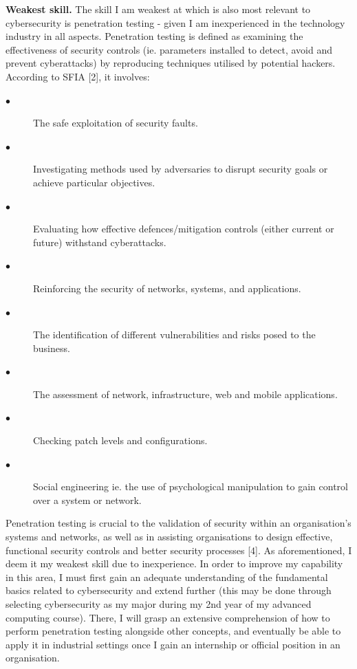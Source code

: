 \documentclass[a4paper, 11pt]{report}
\begin{document}
\textbf{Weakest skill.}
\newline The skill I am weakest at which is also most relevant to cybersecurity is penetration testing - given I am inexperienced in the technology industry in all aspects. Penetration testing is defined as examining the effectiveness of security controls (ie. parameters installed to detect, avoid and prevent cyberattacks) by reproducing techniques utilised by potential hackers. According to SFIA [2], it involves:
\begin{description}
\item[$\bullet$]  The safe exploitation of security faults.
\item[$\bullet$]  Investigating methods used by adversaries to disrupt security goals or achieve particular objectives.
\item[$\bullet$]  Evaluating how effective defences/mitigation controls (either current or future) withstand cyberattacks. 
\item[$\bullet$]  Reinforcing the security of networks, systems, and applications.
\item[$\bullet$]  The identification of different vulnerabilities and risks posed to the business.
\item[$\bullet$]  The assessment of network, infrastructure, web and mobile applications.
\item[$\bullet$]  Checking patch levels and configurations.
\item[$\bullet$]  Social engineering ie. the use of psychological manipulation to gain control over a system or network.
\end{description}

Penetration testing is crucial to the validation of security within an organisation’s systems and networks, as well as in assisting organisations to design effective, functional security controls and better security processes [4]. As aforementioned, I deem it my weakest skill due to inexperience. In order to improve my capability in this area, I must first gain an adequate understanding of the fundamental basics related to cybersecurity and extend further (this may be done through selecting cybersecurity as my major during my 2nd year of my advanced computing course). There, I will grasp an extensive comprehension of how to perform penetration testing alongside other concepts, and eventually be able to apply it in industrial settings once I gain an internship or official position in an organisation. 
\end{document}
